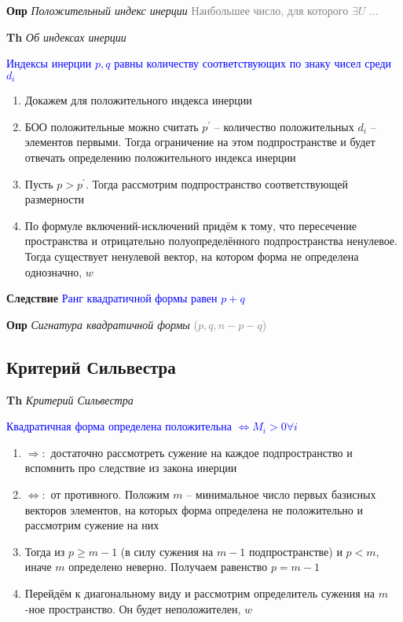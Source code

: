 \documentclass[a4paper, 14pt]{article}
\begin{document}
    \textbf{Опр} \textit{Положительный индекс инерции} \textcolor{gray}{Наибольшее число, для которого $\exists U$ ...}
    
    \textbf{Th} \textit{Об индексах инерции}
    
    \textcolor{blue}{Индексы инерции $p, q$ равны количеству соответствующих по знаку чисел среди $d_i$}
    
    \begin{enumerate}
        \item Докажем для положительного индекса инерции
        \item БОО положительные можно считать $p^{'}$ -- количество положительных $d_i$ -- элементов первыми.
        Тогда ограничение на этом подпространстве и будет отвечать определению положительного индекса инерции
        \item Пусть $p > p^{'}$.
        Тогда рассмотрим подпространство соответствующей размерности
        \item По формуле включений-исключений придём к тому, что пересечение пространства и отрицательно
        полуопределённого подпространства ненулевое.
        Тогда существует ненулевой вектор, на котором форма не определена однозначно, $w$
    \end{enumerate}
    
    \textbf{Следствие} \textcolor{blue}{Ранг квадратичной формы равен $p + q$}
    
    \textbf{Опр} \textit{Сигнатура квадратичной формы} \textcolor{gray}{($p, q, n - p - q$)}
    
    \subsection{Критерий Сильвестра}
    
    \textbf{Th} \textit{Критерий Сильвестра}
    
    \textcolor{blue}{Квадратичная форма определена положительна $\Leftrightarrow M_i > 0 \forall i$}
    
    \begin{enumerate}
        \item $\Rightarrow:$ достаточно рассмотреть сужение на каждое подпространство и вспомнить про следствие из
        закона инерции
        \item $\Leftrightarrow:$ от противного.
        Положим $m$ -- минимальное число первых базисных векторов элементов, на которых форма определена не
        положительно и рассмотрим сужение на них
        \item Тогда из $p \geq m - 1$ (в силу сужения на $m - 1$ подпространстве) и $p < m$, иначе $m$ определено
        неверно.
        Получаем равенство $p = m - 1$
        \item Перейдём к диагональному виду и рассмотрим определитель сужения на $m$-ное пространство.
        Он будет неположителен, $w$
    \end{enumerate}
    
\end{document}
